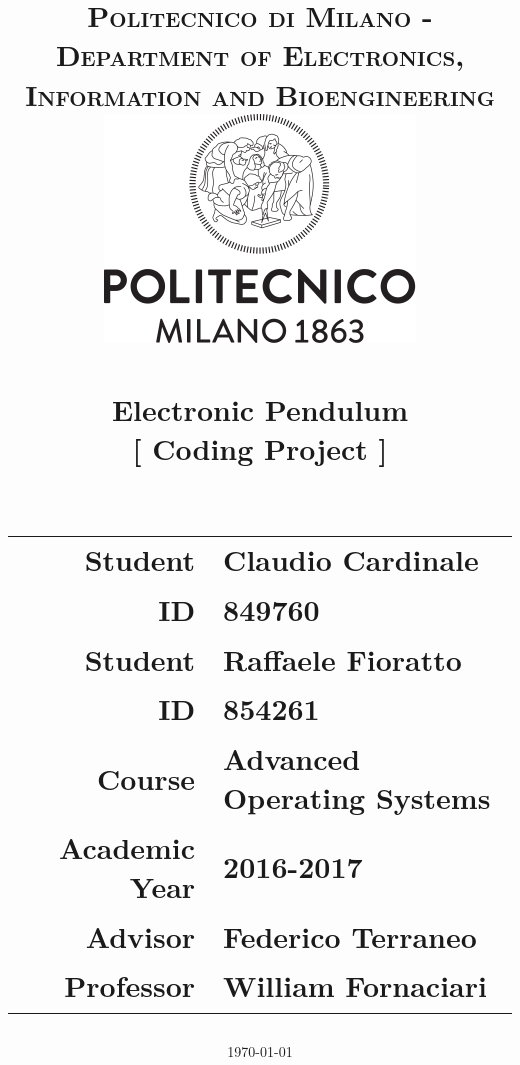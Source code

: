 \documentclass[12pt, english]{scrartcl}
\title{\normalfont \normalsize 
\textsc{Politecnico di Milano - Department of Electronics, Information and Bioengineering} \\[1cm]
\includegraphics[scale=1.2]{polimi} \\[1cm]
\horrule{0.5pt} \\[0.4cm]
\huge \textbf{Electronic Pendulum} \\[.5cm] %
\large [ Coding Project ] \\ %
\horrule{2pt} \\[0.5cm]
\vfill
\author{}
\begin{tabular}{r l}
\textbf{Student} & Claudio Cardinale \\
\textbf{ID} & 849760 \\[0.5cm]
\textbf{Student} & Raffaele Fioratto \\
\textbf{ID} & 854261 \\[0.5cm]
\textbf{Course} & Advanced Operating Systems \\
\textbf{Academic Year} & 2016-2017 \\[0.5cm]
\textbf{Advisor} & Federico Terraneo \\ %
\textbf{Professor} & William Fornaciari \\
\end{tabular}
\date{\normalsize\today}
}
\begin{document}
\maketitle %

\pagebreak\tableofcontents\pagebreak

%



\pagebreak


\end{document}
